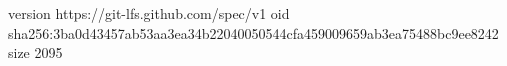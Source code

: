version https://git-lfs.github.com/spec/v1
oid sha256:3ba0d43457ab53aa3ea34b22040050544cfa459009659ab3ea75488bc9ee8242
size 2095
